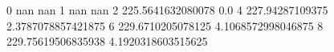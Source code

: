 0 nan nan
1 nan nan
2 225.5641632080078 0.0
4 227.94287109375 2.3787078857421875
6 229.6710205078125 4.1068572998046875
8 229.75619506835938 4.1920318603515625
